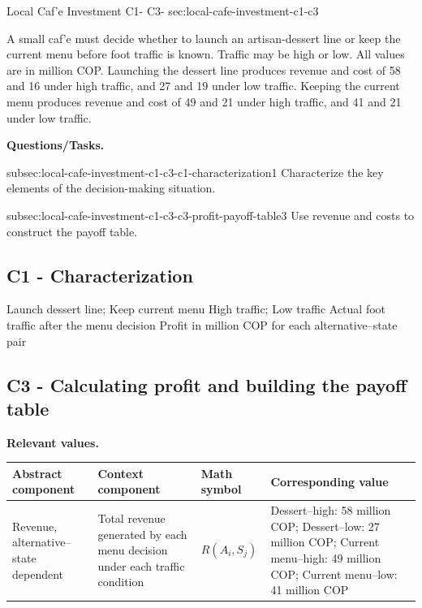 	\sectionScored
	{Local Caf'e Investment}
	{C1- \hspace{2mm} C3-}
	{sec:local-cafe-investment-c1-c3}
	{
		A small caf'e must decide whether to launch an artisan-dessert line or keep the current menu before foot traffic is known. Traffic may be high or low. All values are in million COP. Launching the dessert line produces revenue and cost of 58 and 16 under high traffic, and 27 and 19 under low traffic. Keeping the current menu produces revenue and cost of 49 and 21 under high traffic, and 41 and 21 under low traffic.
		
		\textbf{Questions/Tasks.}
		\begin{enumerate}
			\CriterionTask
			{subsec:local-cafe-investment-c1-c3-c1-characterization}{1}
			{Characterize the key elements of the decision-making situation. }
			
			\CriterionTask
			{subsec:local-cafe-investment-c1-c3-c3-profit-payoff-table}{3}
			{Use revenue and costs to construct the payoff table. }
		\end{enumerate}
		
		\label{subsec:local-cafe-investment-c1-c3-c1-characterization}
		\subsection*{C1 - Characterization }
		
		\DecisionElementsTable
		{Launch dessert line; Keep current menu}
		{High traffic; Low traffic}
		{Actual foot traffic after the menu decision}
		{Profit in million COP for each alternative--state pair}
		
		\label{subsec:local-cafe-investment-c1-c3-c3-profit-payoff-table}
		\subsection*{C3 - Calculating profit and building the payoff table }
		
		\textbf{Relevant values.}
		
		\begin{center}
			\small
			\begin{tabularx}{\textwidth}{
					>{\raggedright\arraybackslash}X
					>{\raggedright\arraybackslash}X
					>{\centering\arraybackslash}p{}
					>{\raggedright\arraybackslash}X
				}
				\toprule
				Abstract component & Context component & Math symbol & Corresponding value \\
				\midrule
				Revenue, alternative--state dependent
				&
				Total revenue generated by each menu decision under each traffic condition
				&
				$R(A_i,S_j)$
				&
				Dessert--high: 58 million COP; Dessert--low: 27 million COP; Current menu--high: 49 million COP; Current menu--low: 41 million COP
				\\
				

\end{tabularx}
\end{center}}
